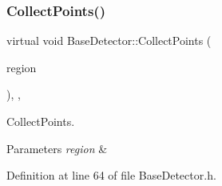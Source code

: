 \mbox{\label{class_base_detector_a20380b0980c6f262b0829f37fb89d2a7}} 
\subsubsection{\texorpdfstring{Collect\+Points()}{CollectPoints()}}
{\footnotesize\ttfamily virtual void Base\+Detector\+::\+Collect\+Points (\begin{DoxyParamCaption}\item[{\mbox{\hyperlink{class_c_region}{C\+Region}} \&}]{region }\end{DoxyParamCaption})\hspace{0.3cm}{\ttfamily [inline]}, {\ttfamily [virtual]}, {\ttfamily [inherited]}}



Collect\+Points. 


\begin{DoxyParams}{Parameters}
{\em region} & \\
\hline
\end{DoxyParams}


Definition at line 64 of file Base\+Detector.\+h.


